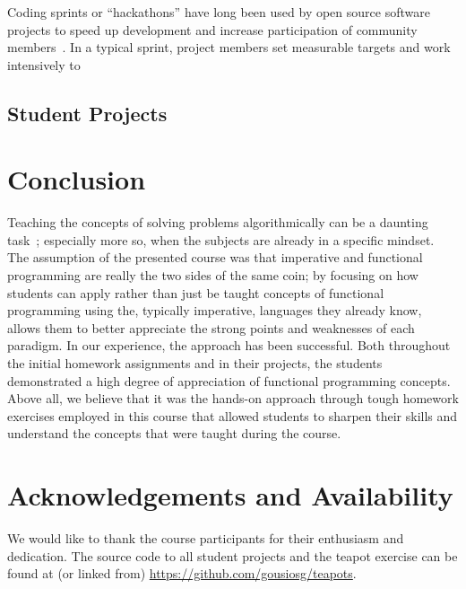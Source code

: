 \documentclass[conference]{IEEEtran}
\begin{document}
Coding sprints or ``hackathons'' have long been used by open source software
projects to speed up development and increase participation of community
members~\cite{Adams11}. In a typical sprint, project members set measurable
targets and work intensively to 



\subsection{Student Projects}

\section{Conclusion}

Teaching the concepts of solving problems algorithmically can be a daunting
task~\cite{Futsc06}; especially more so, when the subjects are already in a
specific mindset. The assumption of the presented course was that imperative and
functional programming are really the two sides of the same coin; by focusing on
how students can apply rather than just be taught concepts of functional
programming using the, typically imperative, languages they already know, allows
them to better appreciate the strong points and weaknesses of each paradigm. In
our experience, the approach has been successful. Both throughout the initial
homework assignments and in their projects, the students demonstrated a high
degree of appreciation of functional programming concepts. Above all, we
believe that it was the hands-on approach through tough homework exercises
employed in this course that allowed students to sharpen their skills and
understand the concepts that were taught during the course.

\section*{Acknowledgements and Availability}

We would like to thank the course participants for their enthusiasm and
dedication. The source code to all student projects and the teapot
exercise can be found at (or linked from) \url{https://github.com/gousiosg/teapots}. 



\end{document}
